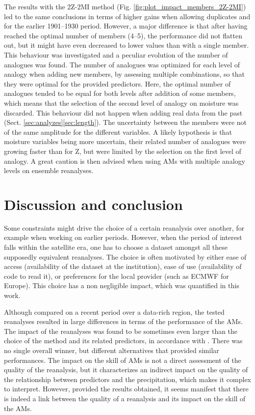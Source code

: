 \documentclass{ametsoc}
\begin{document}
The results with the 2Z-2MI method (Fig. \ref{fig:plot_impact_members_2Z-2MI}) led to the same conclusions in terms of higher gains when allowing duplicates and for the earlier 1901--1930 period. However, a major difference is that after having reached the optimal number of members (4--5), the performance did not flatten out, but it might have even decreased to lower values than with a single member. This behaviour was investigated and a peculiar evolution of the number of analogues was found. The number of analogues was optimized for each level of analogy when adding new members, by assessing multiple combinations, so that they were optimal for the provided predictors. Here, the optimal number of analogues tended to be equal for both levels after addition of some members, which means that the selection of the second level of analogy on moisture was discarded. This behaviour did not happen when adding real data from the past (Sect. \ref{sec:analyzes}\ref{sec:length}). The uncertainty between the members were not of the same amplitude for the different variables. A likely hypothesis is that moisture variables being more uncertain, their related number of analogues were growing faster than for Z, but were limited by the selection on the first level of analogy. A great caution is then advised when using AMs with multiple analogy levels on ensemble reanalyses.


\section{Discussion and conclusion}

Some constraints might drive the choice of a certain reanalysis over another, for example when working on earlier periods. However, when the period of interest falls within the satellite era, one has to choose a dataset amongst all these supposedly equivalent reanalyses. The choice is often motivated by either ease of access (availability of the dataset at the institution), ease of use (availability of code to read it), or  preferences for the local provider (such as ECMWF for Europe). This choice has a non negligible impact, which was quantified in this work.

Although compared on a recent period over a data-rich region, the tested reanalyses resulted in large differences in terms of the performance of the AMs. The impact of the reanalyses was found to be sometimes even larger than the choice of the method and its related predictors, in accordance with \citet{Dayon2015}. There was no single overall winner, but different alternatives that provided similar performances. The impact on the skill of AMs is not a direct assessment of the quality of the reanalysis, but it characterizes an indirect impact on the quality of the relationship between predictors and the precipitation, which makes it complex to interpret. However, provided the results obtained, it seems manifest that there is indeed a link between the quality of a reanalysis and its impact on the skill of the AMs.
\end{document}
